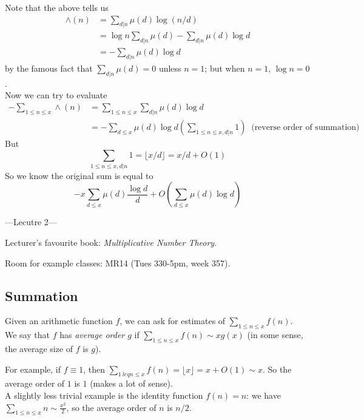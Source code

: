 \documentclass[a4paper]{article}
\begin{document}
Note that the above tells us
\begin{equation*}
\begin{aligned}
\wedge(n) &= \sum_{d|n} \mu(d) \log(n/d)\\
&=\log n \sum_{d|n}\mu(d) - \sum_{d|n} \mu(d)\log d\\
&= -\sum_{d|n} \mu(d)\log d
\end{aligned}
\end{equation*}
by the famous fact that $\sum_{d|n}\mu(d)=0$ unless $n=1$; but when $n=1$, $\log n = 0$.\\
Now we can try to evaluate
\begin{equation*}
\begin{aligned}
-\sum_{1 \leq n \leq x} \wedge(n) &= \sum_{1 \leq n \leq x} \sum_{d|n} \mu(d) \log d \\
&= -\sum_{d \leq x} \mu(d) \log d (\sum_{1 \leq n \leq x, d|n} 1)\ \text{ (reverse order of summation)}
\end{aligned}
\end{equation*}
But
$$\sum_{1 \leq n \leq x, d|n} 1 = \lfloor x/d \rfloor = x/d + O(1)$$
So we know the original sum is equal to
$$-x\sum_{d \leq x} \mu(d) \frac{\log d}{d} + O(\sum_{d \leq x} \mu(d) \log d)$$

---Lecutre 2---

Lecturer's favourite book: \emph{Multiplicative Number Theory}.

Room for example classes: MR14 (Tues 330-5pm, week 357).

\subsection{Summation}
Given an arithmetic function $f$, we can ask for estimates of $\sum_{1 \leq n \leq x} f(n)$.\\
We say that $f$ has \emph{average order $g$} if $\sum_{1 \leq n \leq x} f(n) \sim xg(x)$ (in some sense, the average size of $f$ is $g$).

For example, if $f \equiv 1$, then $\sum_{1\ leq n \leq x} f(n) = \lfloor x \rfloor = x+O(1) \sim x$. So the average order of $1$ is $1$ (makes a lot of sense).\\
A slightly less trivial example is the identity function $f(n) = n$: we have $\sum_{1 \leq n \leq x} n \sim \frac{x^2}{2}$, so the average order of $n$ is $n/2$.
\end{document}
